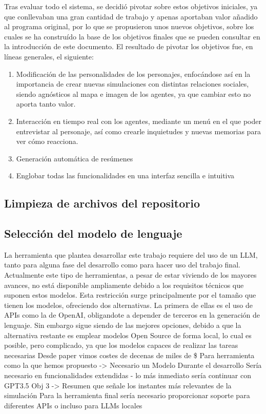 Tras evaluar todo el sistema, se decidió pivotar sobre estos objetivos iniciales, ya que conllevaban una gran cantidad de trabajo y apenas aportaban valor añadido al programa original, por lo que se propusieron unos nuevos objetivos, sobre los cuales se ha construído la base de los objetivos finales que se pueden consultar en la introducción de este documento. El resultado de pivotar los objetivos fue, en líneas generales, el siguiente:

\begin{enumerate}
	\item Modificación de las personalidades de los personajes, enfocándose así en la importancia de crear nuevas simulaciones con distintas relaciones sociales, siendo agnósticos al mapa e imagen de los agentes, ya que cambiar esto no aporta tanto valor.
	
	\item Interacción en tiempo real con los agentes, mediante un menú en el que poder entrevistar al personaje, así como crearle inquietudes y nuevas memorias para ver cómo reacciona.
	
	\item Generación automática de resúmenes
	
	\item Englobar todas las funcionalidades en una interfaz sencilla e intuitiva
\end{enumerate}

\subsection{Limpieza de archivos del repositorio}

\subsection{Selección del modelo de lenguaje}

La herramienta que plantea desarrollar este trabajo requiere del uso de un LLM, tanto para alguna fase del desarrollo como para hacer uso del trabajo final. Actualmente este tipo de herramientas, a pesar de estar viviendo de los mayores avances, no está disponible ampliamente debido a los requisitos técnicos que suponen estos modelos. Esta restricción surge principalmente por el tamaño que tienen los modelos, ofreciendo dos alternativas. La primera de ellas es el uso de APIs como la de OpenAI, obligandote a depender de terceros en la generación de lenguaje. Sin embargo sigue siendo de las mejores opciones, debido a que la alternativa restante es emplear modelos Open Source de forma local, lo cual es posible, pero complicado, ya que los modelos capaces de realizar las tareas necesarias 
Desde paper vimos costes de decenas de miles de \$
Para herramienta como la que hemos propuesto -> Necesario un Modelo
Durante el desarrollo Sería necesario en funcionalidades extendidas - lo más inmediato sería continuar con GPT3.5
	Obj 3 -> Resumen que señale los instantes más relevantes de la simulación
Para la herramienta final sería necesario proporcionar soporte para diferentes APIs o incluso para LLMs locales

